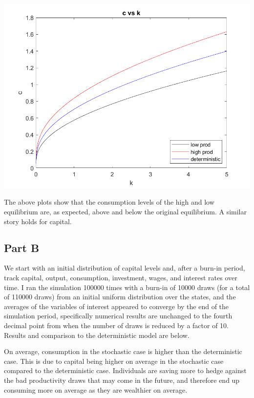 \documentclass[11pt]{article} %
\begin{document}
\includegraphics{q2c}

The above plots show that the consumption levels of the high and low equilibrium are, as expected, above and below the original equilibrium. A similar story holds for capital.

\subsection{Part B}
We start with an initial distribution of capital levels and, after a burn-in period, track capital, output, consumption, investment, wages, and interest rates over time. I ran the simulation 100000 times with a burn-in of 10000 draws (for a total of 110000 draws) from an initial uniform distribution over the states, and the averages of the variables of interest appeared to converge by the end of the simulation period, specifically numerical results are unchanged to the fourth decimal point from when the number of draws is reduced by a factor of 10. Results and comparison to the deterministic model are below.

\begin{center}

\end{center}

On average, consumption in the stochastic case is higher than the deterministic case. This is due to capital being higher on average in the stochastic case compared to the deterministic case. Individuals are saving more to hedge against the bad productivity draws that may come in the future, and therefore end up consuming more on average as they are wealthier on average.
\end{document}
